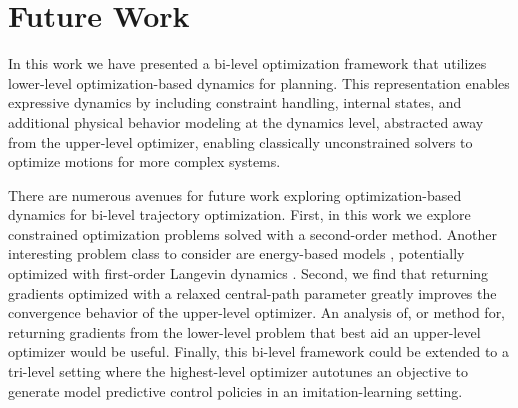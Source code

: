 \section{Future Work} \label{od_future_work}
In this work we have presented a bi-level optimization framework that utilizes lower-level optimization-based dynamics for planning. This representation enables expressive dynamics by including constraint handling, internal states, and additional physical behavior modeling at the dynamics level, abstracted away from the upper-level optimizer, enabling classically unconstrained solvers to optimize motions for more complex systems.

There are numerous avenues for future work exploring optimization-based dynamics for bi-level trajectory optimization. First, in this work we explore constrained optimization problems solved with a second-order method. Another interesting problem class to consider are energy-based models \cite{lecun2006tutorial}, potentially optimized with first-order Langevin dynamics \cite{schlick2010molecular}. Second, we find that returning gradients optimized with a relaxed central-path parameter greatly improves the convergence behavior of the upper-level optimizer. An analysis of, or method for, returning gradients from the lower-level problem that best aid an upper-level optimizer would be useful. Finally, this bi-level framework could be extended to a tri-level setting where the highest-level optimizer autotunes an objective to generate model predictive control policies in an imitation-learning setting.

